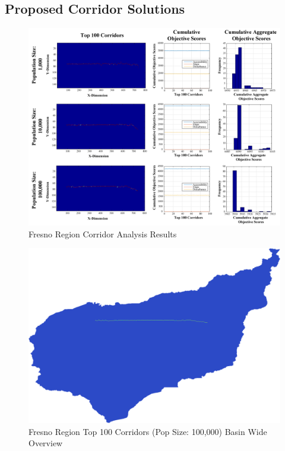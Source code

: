    \subsection{Proposed Corridor Solutions}
    
        \begin{figure}[!h]
            \begin{center}
            \includegraphics[width=6in]{figures/Fresno_PathwayResults.png}   
            \caption{Fresno Region Corridor Analysis Results}
            \label{fig:Fresults}
            \end{center}
        \end{figure}

        \begin{figure}[!h]
            \begin{center}
            \includegraphics[width=5.5in]{figures/Fresno_PathwayLarge.png}   
            \caption{Fresno Region Top 100 Corridors (Pop Size: 100,000) Basin Wide Overview}
            \label{fig:FsolutionOverview}
            \end{center}
        \end{figure}
        
